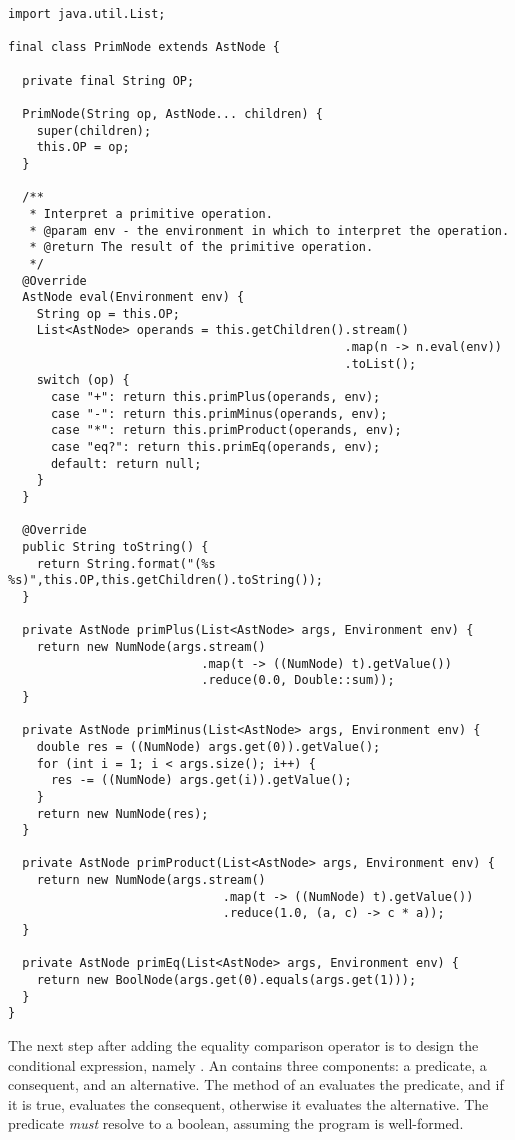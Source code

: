 \begin{lstlisting}[language=MyJava]
import java.util.List;

final class PrimNode extends AstNode {

  private final String OP;

  PrimNode(String op, AstNode... children) {
    super(children);
    this.OP = op;
  }

  /**
   * Interpret a primitive operation.
   * @param env - the environment in which to interpret the operation.
   * @return The result of the primitive operation.
   */
  @Override
  AstNode eval(Environment env) {
    String op = this.OP;
    List<AstNode> operands = this.getChildren().stream()
                                               .map(n -> n.eval(env))
                                               .toList();
    switch (op) {
      case "+": return this.primPlus(operands, env);
      case "-": return this.primMinus(operands, env);
      case "*": return this.primProduct(operands, env);
      case "eq?": return this.primEq(operands, env);
      default: return null;
    }
  }

  @Override
  public String toString() {
    return String.format("(%s %s)",this.OP,this.getChildren().toString());
  }

  private AstNode primPlus(List<AstNode> args, Environment env) {
    return new NumNode(args.stream()
                           .map(t -> ((NumNode) t).getValue())
                           .reduce(0.0, Double::sum));
  }

  private AstNode primMinus(List<AstNode> args, Environment env) {
    double res = ((NumNode) args.get(0)).getValue();
    for (int i = 1; i < args.size(); i++) {
      res -= ((NumNode) args.get(i)).getValue();
    }
    return new NumNode(res);
  }

  private AstNode primProduct(List<AstNode> args, Environment env) {
    return new NumNode(args.stream()
                              .map(t -> ((NumNode) t).getValue())
                              .reduce(1.0, (a, c) -> c * a));
  }

  private AstNode primEq(List<AstNode> args, Environment env) {
    return new BoolNode(args.get(0).equals(args.get(1)));
  }
}
\end{lstlisting}

The next step after adding the equality comparison operator is to design the conditional expression, namely . An  contains three components: a predicate, a consequent, and an alternative. The  method of an  evaluates the predicate, and if it is true, evaluates the consequent, otherwise it evaluates the alternative. The predicate \emph{must} resolve to a boolean, assuming the program is well-formed. 


